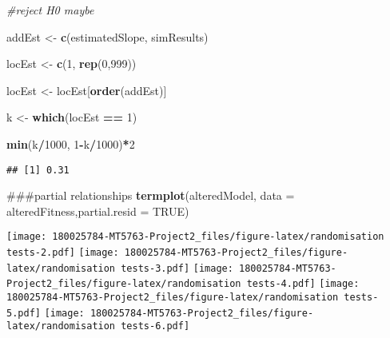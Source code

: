 \documentclass[]{article}
\newenvironment{Shaded}{\begin{snugshade}}{\end{snugshade}}
\newcommand{\KeywordTok}[1]{\textcolor[rgb]{0.13,0.29,0.53}{\textbf{#1}}}
\newcommand{\DataTypeTok}[1]{\textcolor[rgb]{0.13,0.29,0.53}{#1}}
\newcommand{\DecValTok}[1]{\textcolor[rgb]{0.00,0.00,0.81}{#1}}
\newcommand{\StringTok}[1]{\textcolor[rgb]{0.31,0.60,0.02}{#1}}
\newcommand{\CommentTok}[1]{\textcolor[rgb]{0.56,0.35,0.01}{\textit{#1}}}
\newcommand{\OtherTok}[1]{\textcolor[rgb]{0.56,0.35,0.01}{#1}}
\newcommand{\OperatorTok}[1]{\textcolor[rgb]{0.81,0.36,0.00}{\textbf{#1}}}
\newcommand{\NormalTok}[1]{#1}
\begin{document}
\begin{Shaded}
\begin{Highlighting}[]
\CommentTok{#reject H0 maybe}

\NormalTok{addEst <-}\StringTok{ }\KeywordTok{c}\NormalTok{(estimatedSlope, simResults)}

\NormalTok{locEst <-}\StringTok{ }\KeywordTok{c}\NormalTok{(}\DecValTok{1}\NormalTok{, }\KeywordTok{rep}\NormalTok{(}\DecValTok{0}\NormalTok{,}\DecValTok{999}\NormalTok{))}

\NormalTok{locEst <-}\StringTok{ }\NormalTok{locEst[}\KeywordTok{order}\NormalTok{(addEst)]}

\NormalTok{k <-}\StringTok{ }\KeywordTok{which}\NormalTok{(locEst }\OperatorTok{==}\StringTok{ }\DecValTok{1}\NormalTok{)}

\KeywordTok{min}\NormalTok{(k}\OperatorTok{/}\DecValTok{1000}\NormalTok{, }\DecValTok{1}\OperatorTok{-}\NormalTok{k}\OperatorTok{/}\DecValTok{1000}\NormalTok{)}\OperatorTok{*}\DecValTok{2}
\end{Highlighting}
\end{Shaded}

\begin{verbatim}
## [1] 0.31
\end{verbatim}

\begin{Shaded}
\begin{Highlighting}[]
\NormalTok{###partial relationships}
\KeywordTok{termplot}\NormalTok{(alteredModel, }\DataTypeTok{data =}\NormalTok{ alteredFitness,}\DataTypeTok{partial.resid =} \OtherTok{TRUE}\NormalTok{)}
\end{Highlighting}
\end{Shaded}

\texttt{[image: 180025784-MT5763-Project2\_files/figure-latex/randomisation tests-2.pdf]}
\texttt{[image: 180025784-MT5763-Project2\_files/figure-latex/randomisation tests-3.pdf]}
\texttt{[image: 180025784-MT5763-Project2\_files/figure-latex/randomisation tests-4.pdf]}
\texttt{[image: 180025784-MT5763-Project2\_files/figure-latex/randomisation tests-5.pdf]}
\texttt{[image: 180025784-MT5763-Project2\_files/figure-latex/randomisation tests-6.pdf]}
\end{document}

